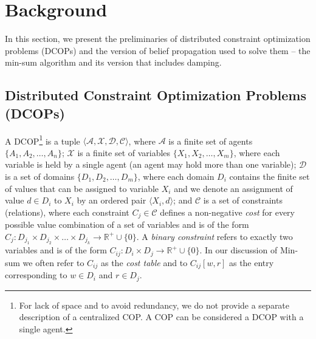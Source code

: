 \section{Background}
\label{Sec:background}
In this section, we present the preliminaries of distributed constraint optimization problems (DCOPs) and the version of belief propagation used to solve them -- the min-sum algorithm and its version that includes damping.
\subsection{Distributed Constraint Optimization Problems (DCOPs)}
\label{Sec:DCOP_defs}
\sloppy
A DCOP\footnote{For lack of space and to avoid redundancy, we do not provide a separate description of a centralized COP. A COP can be considered a DCOP with a single agent.} is a tuple $\langle{\mathcal A},{\mathcal X},{\mathcal D},{\mathcal C}\rangle$, where ${\mathcal A}$ is a finite set of agents $\{ A_1,A_2,\ldots,A_n \}$; ${\mathcal X}$ is a finite set of variables $\{ X_1,X_2,\ldots,X_m \}$, where each variable is held by a single agent (an agent may hold more than one variable); ${\mathcal D}$ is a set of domains $\{ D_1, D_2,\ldots,D_m \}$, where each domain $D_i$ contains the finite set of values that can be assigned to variable $X_i$ and we denote an assignment of value $d \in D_i$ to $X_i$ by an ordered pair $\langle X_i, d \rangle$; and ${\mathcal C}$ is a set of constraints (relations), where each constraint $C_j \in {\mathcal C}$ defines a non-negative {\em cost} for every possible value combination of a set of variables and is of the form $C_j : D_{j_1} \times D_{j_2} \times \ldots \times D_{j_k} \rightarrow \mathbb{R}^+ \cup \{0\}$. A {\em binary constraint} refers to exactly two variables and is of the form $C_{ij} : D_i \times D_j \rightarrow \mathbb{R}^+ \cup \{0\}$.
In our discussion of Min-sum we often refer to $C_{ij}$ as the {\em cost table} and to $C_{ij}[w,r]$ as the entry corresponding to $w \in D_i$ and $r \in D_j$.

